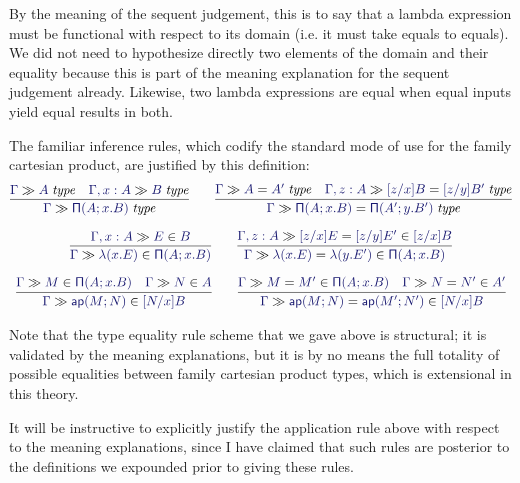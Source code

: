 \documentclass[main.tex]{subfiles}
\begin{document}
By the meaning of the sequent judgement, this is to say that a lambda
expression must be functional with respect to its domain (i.e. it must take
equals to equals). We did not need to hypothesize directly two elements of the
domain and their equality because this is part of the meaning explanation for
the sequent judgement already. Likewise, two lambda expressions are equal when
equal inputs yield equal results in both.

The familiar inference rules, which codify the standard mode of use for the
family cartesian product, are justified by this definition:
\begin{gather*}
  \infer{
    \sequent\Gamma\isset{\typrod{A}{x}{B}}
  }{
    \sequent\Gamma\isset{A} &
    \sequent{\Gamma,x:A}{\isset{B}}
  }\qquad
  \infer{
    \sequent\Gamma\eisset{\typrod{A}{x}{B}}{\typrod{A'}{y}{B'}}
  }{
    \sequent\Gamma\eisset{A}{A'} &
    \sequent{\Gamma,z:A}{\eisset{[z/x]B}{[z/y]B'}}
  }\\[6pt]
  \infer{
    \sequent\Gamma\ver{\lam{x}{E}}{\typrod{A}{x}{B}}
  }{
    \sequent{\Gamma,x:A}{\ver{E}{B}}
  }\qquad
  \infer{
    \sequent\Gamma\ever{\lam{x}{E}}{\lam{y}{E'}}{\typrod{A}{x}{B}}
  }{
    \sequent{\Gamma,z:A}{\ever{[z/x]E}{[z/y]E'}{[z/x]B}}
  }\\[6pt]
  \infer{
    \sequent\Gamma\ver{\ap{M}{N}}{[N/x]B}
  }{
    \sequent\Gamma\ver{M}{\typrod{A}{x}{B}} &
    \sequent\Gamma\ver{N}{A}
  }\qquad
  \infer{
    \sequent\Gamma\ever{\ap{M}{N}}{\ap{M'}{N'}}{[N/x]B}
  }{
    \sequent\Gamma\ever{M}{M'}{\typrod{A}{x}{B}} &
    \sequent\Gamma\ever{N}{N'}{A'}
  }
\end{gather*}

Note that the type equality rule scheme that we gave above is structural; it is
validated by the meaning explanations, but it is by no means the full totality
of possible equalities between family cartesian product types, which is
extensional in this theory.

It will be instructive to explicitly justify the application rule above with
respect to the meaning explanations, since I have claimed that such rules are
posterior to the definitions we expounded prior to giving these rules.
\end{document}
